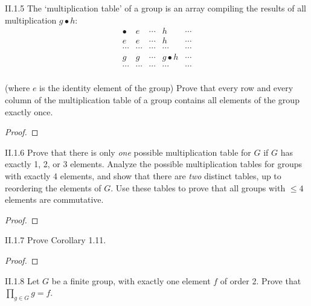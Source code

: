 \begin{exercise}{II.1.5}
	The `multiplication table' of a group is an array compiling the results of all multiplication $g\bullet h$:
	\begin{equation*}
		\begin{array}{c||c||c|c|c}
			\bullet & e      & \cdots & h         & \cdots \\
			\hline
			\hline
			e       & e      & \cdots & h         & \cdots \\
			\hline
			\cdots  & \cdots & \cdots & \cdots    & \cdots \\
			\hline
			g       & g      & \cdots & g\bullet h & \cdots \\
			\hline
			\cdots  & \cdots & \cdots & \cdots    & \cdots \\
		\end{array}
	\end{equation*}

	(where $e$ is the identity element of the group) Prove that every row and every column of the multiplication table of a group contains all elements of the group exactly once.
\end{exercise}

\begin{proof}
\end{proof}

\begin{exercise}{II.1.6}
	Prove that there is only \textit{one} possible multiplication table for $G$ if $G$ has exactly 1, 2, or 3 elements. Analyze the possible multiplication tables for groups with exactly 4 elements, and show that there are \textit{two} distinct tables, up to reordering the elements of $G$. Use these tables to prove that all groups with $\leq 4$ elements are commutative.
\end{exercise}

\begin{proof}
\end{proof}

\begin{exercise}{II.1.7}
	Prove Corollary 1.11.
\end{exercise}

\begin{proof}
\end{proof}

\begin{exercise}{II.1.8}
	Let $G$ be a finite group, with exactly one element $f$ of order 2. Prove that $\prod_{g\in G}g = f$.
\end{exercise}

